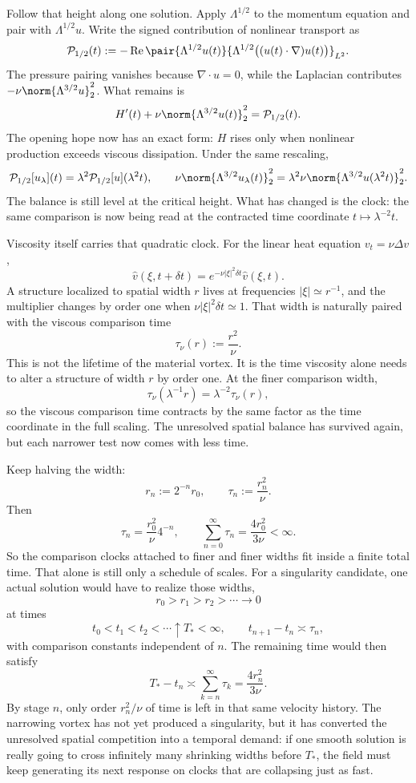 Follow that height along one solution. Apply \(\Lambda^{1/2}\) to the momentum equation and pair with \(\Lambda^{1/2}u\). Write the signed contribution of nonlinear transport as
\[
  \mathcal P_{1/2}(t)
  :=
  -\operatorname{Re}
  \pair
    {\Lambda^{1/2}u(t)}
    {\Lambda^{1/2}\bigl((u(t)\cdot\nabla)u(t)\bigr)}_{L^2}.
\]
The pressure pairing vanishes because \(\nabla\cdot u=0\), while the Laplacian contributes \(-\nu\norm{\Lambda^{3/2}u}_2^2\). What remains is
\[
  H'(t)
  +
  \nu\norm{\Lambda^{3/2}u(t)}_2^2
  =
  \mathcal P_{1/2}(t).
\]
The opening hope now has an exact form: \(H\) rises only when nonlinear production exceeds viscous dissipation. Under the same rescaling,
\[
  \mathcal P_{1/2}[u_\lambda](t)
  =
  \lambda^2\mathcal P_{1/2}[u](\lambda^2t),
  \qquad
  \nu\norm{\Lambda^{3/2}u_\lambda(t)}_2^2
  =
  \lambda^2\nu\norm{\Lambda^{3/2}u(\lambda^2t)}_2^2.
\]
The balance is still level at the critical height. What has changed is the clock: the same comparison is now being read at the contracted time coordinate \(t\mapsto\lambda^{-2}t\).

Viscosity itself carries that quadratic clock. For the linear heat equation \(v_t=\nu\Delta v\),
\[
  \widehat v(\xi,t+\delta t)
  =
  e^{-\nu|\xi|^2\delta t}\widehat v(\xi,t).
\]
A structure localized to spatial width \(r\) lives at frequencies \(|\xi|\simeq r^{-1}\), and the multiplier changes by order one when \(\nu|\xi|^2\delta t\simeq1\). That width is naturally paired with the viscous comparison time
\[
  \tau_\nu(r)
  :=
  \frac{r^2}{\nu}.
\]
This is not the lifetime of the material vortex. It is the time viscosity alone needs to alter a structure of width \(r\) by order one. At the finer comparison width,
\[
  \tau_\nu(\lambda^{-1}r)
  =
  \lambda^{-2}\tau_\nu(r),
\]
so the viscous comparison time contracts by the same factor as the time coordinate in the full \NavierStokes{} scaling. The unresolved spatial balance has survived again, but each narrower test now comes with less time.

Keep halving the width:
\[
  r_n:=2^{-n}r_0,
  \qquad
  \tau_n:=\frac{r_n^2}{\nu}.
\]
Then
\[
  \tau_n
  =
  \frac{r_0^2}{\nu}4^{-n},
  \qquad
  \sum_{n=0}^{\infty}\tau_n
  =
  \frac{4r_0^2}{3\nu}
  <
  \infty.
\]
So the comparison clocks attached to finer and finer widths fit inside a finite total time. That alone is still only a schedule of scales. For a singularity candidate, one actual solution would have to realize those widths,
\[
  r_0>r_1>r_2>\cdots\longrightarrow0
\]
at times
\[
  t_0<t_1<t_2<\cdots\uparrow T_*<\infty,
  \qquad
  t_{n+1}-t_n\asymp\tau_n,
\]
with comparison constants independent of \(n\). The remaining time would then satisfy
\[
  T_*-t_n
  \asymp
  \sum_{k=n}^{\infty}\tau_k
  =
  \frac{4r_n^2}{3\nu}.
\]
By stage \(n\), only order \(r_n^2/\nu\) of time is left in that same velocity history. The narrowing vortex has not yet produced a singularity, but it has converted the unresolved spatial competition into a temporal demand: if one smooth solution is really going to cross infinitely many shrinking widths before \(T_*\), the field must keep generating its next response on clocks that are collapsing just as fast.